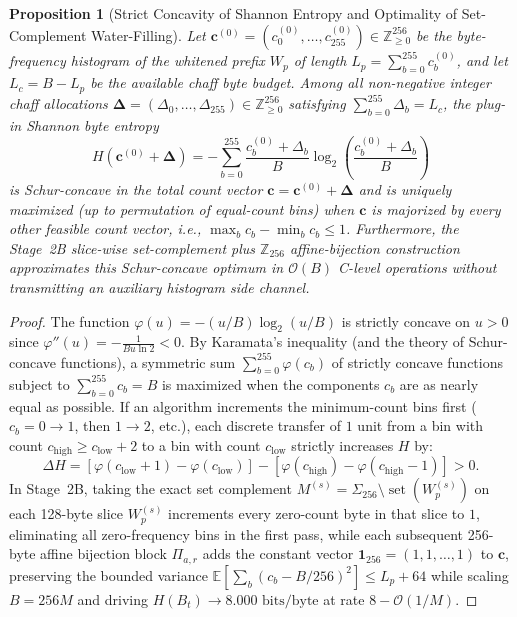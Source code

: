 \documentclass[conference,10pt]{IEEEtran}
\newtheorem{proposition}{Proposition}
\begin{document}
\begin{proposition}[Strict Concavity of Shannon Entropy and Optimality of Set-Complement Water-Filling]
\label{prop:waterfilling}
Let $\mathbf{c}^{(0)} = (c_0^{(0)}, \dots, c_{255}^{(0)}) \in \mathbb{Z}_{\ge 0}^{256}$ be the byte-frequency histogram of the whitened prefix $W_p$ of length $L_p = \sum_{b=0}^{255} c_b^{(0)}$, and let $L_c = B - L_p$ be the available chaff byte budget. Among all non-negative integer chaff allocations $\mathbf{\Delta} = (\Delta_0, \dots, \Delta_{255}) \in \mathbb{Z}_{\ge 0}^{256}$ satisfying $\sum_{b=0}^{255} \Delta_b = L_c$, the plug-in Shannon byte entropy
\begin{equation}
\label{eq:concave_obj}
H(\mathbf{c}^{(0)} + \mathbf{\Delta}) = -\sum_{b=0}^{255} \frac{c_b^{(0)} + \Delta_b}{B} \log_2 \left(\frac{c_b^{(0)} + \Delta_b}{B}\right)
\end{equation}
is Schur-concave in the total count vector $\mathbf{c} = \mathbf{c}^{(0)} + \mathbf{\Delta}$ and is uniquely maximized (up to permutation of equal-count bins) when $\mathbf{c}$ is majorized by every other feasible count vector, i.e., $\max_b c_b - \min_b c_b \le 1$. Furthermore, the Stage~2B slice-wise set-complement plus $\mathbb{Z}_{256}$ affine-bijection construction approximates this Schur-concave optimum in $\mathcal{O}(B)$ C-level operations without transmitting an auxiliary histogram side channel.
\end{proposition}

\begin{proof}
The function $\varphi(u) = -(u/B) \log_2(u/B)$ is strictly concave on $u > 0$ since $\varphi''(u) = -\frac{1}{B u \ln 2} < 0$. By Karamata's inequality (and the theory of Schur-concave functions), a symmetric sum $\sum_{b=0}^{255} \varphi(c_b)$ of strictly concave functions subject to $\sum_{b=0}^{255} c_b = B$ is maximized when the components $c_b$ are as nearly equal as possible. If an algorithm increments the minimum-count bins first ($c_b = 0 \to 1$, then $1 \to 2$, etc.), each discrete transfer of $1$ unit from a bin with count $c_{\text{high}} \ge c_{\text{low}} + 2$ to a bin with count $c_{\text{low}}$ strictly increases $H$ by:
\begin{equation}
\Delta H = \left[\varphi(c_{\text{low}} + 1) - \varphi(c_{\text{low}})\right] - \left[\varphi(c_{\text{high}}) - \varphi(c_{\text{high}} - 1)\right] > 0.
\end{equation}
In Stage~2B, taking the exact set complement $M^{(s)} = \Sigma_{256} \setminus \operatorname{set}(W_p^{(s)})$ on each 128-byte slice $W_p^{(s)}$ increments every zero-count byte in that slice to $1$, eliminating all zero-frequency bins in the first pass, while each subsequent 256-byte affine bijection block $\Pi_{a,r}$ adds the constant vector $\mathbf{1}_{256} = (1, 1, \dots, 1)$ to $\mathbf{c}$, preserving the bounded variance $\mathbb{E}[\sum_b (c_b - B/256)^2] \le L_p + 64$ while scaling $B = 256 M$ and driving $H(B_t) \to 8.000\text{ bits/byte}$ at rate $8 - \mathcal{O}(1/M)$.
\end{proof}
\end{document}
